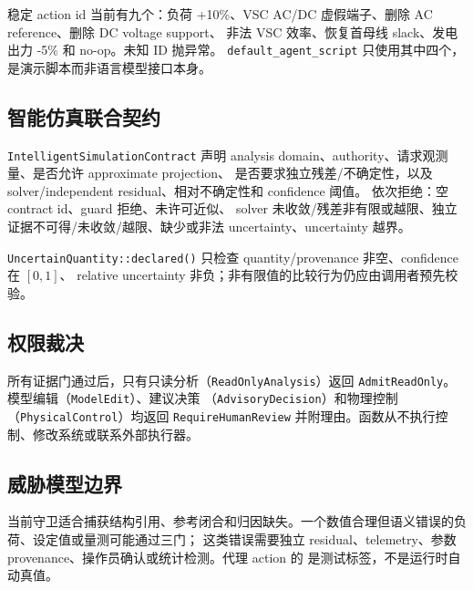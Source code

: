 稳定 action id 当前有九个：负荷 +10\%、VSC AC/DC 虚假端子、删除 AC reference、删除 DC voltage support、
非法 VSC 效率、恢复首母线 slack、发电出力 -5\% 和 no-op。未知 ID 抛异常。
\texttt{default\_agent\_script} 只使用其中四个，是演示脚本而非语言模型接口本身。

\subsection{智能仿真联合契约}

\texttt{IntelligentSimulationContract} 声明 analysis domain、authority、请求观测量、是否允许 approximate projection、
是否要求独立残差/不确定性，以及 solver/independent residual、相对不确定性和 confidence 阈值。
 依次拒绝：空 contract id、guard 拒绝、未许可近似、
solver 未收敛/残差非有限或越限、独立证据不可得/未收敛/越限、缺少或非法 uncertainty、uncertainty 越界。

\texttt{UncertainQuantity::declared()} 只检查 quantity/provenance 非空、confidence 在 $[0,1]$、
relative uncertainty 非负；非有限值的比较行为仍应由调用者预先校验。

\subsection{权限裁决}

所有证据门通过后，只有只读分析（\texttt{ReadOnlyAnalysis}）返回
\texttt{AdmitReadOnly}。模型编辑（\texttt{ModelEdit}）、建议决策
（\texttt{AdvisoryDecision}）和物理控制（\texttt{PhysicalControl}）均返回
\texttt{RequireHumanReview} 并附理由。函数从不执行控制、修改系统或联系外部执行器。

\subsection{威胁模型边界}

当前守卫适合捕获结构引用、参考闭合和归因缺失。一个数值合理但语义错误的负荷、设定值或量测可能通过三门；
这类错误需要独立 residual、telemetry、参数 provenance、操作员确认或统计检测。代理 action 的
 是测试标签，不是运行时自动真值。
